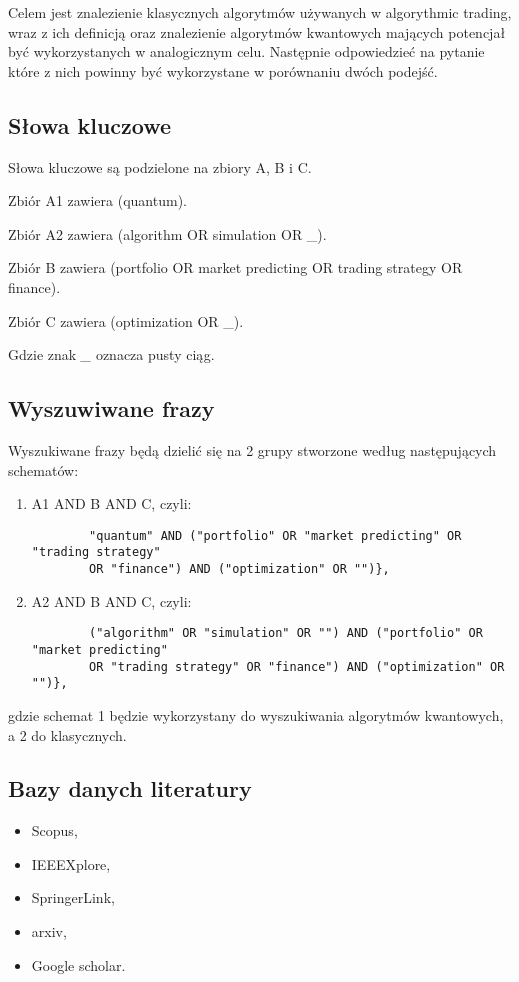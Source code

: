 \documentclass[polish,envcountsect,10pt]{article}
\begin{document}
Celem jest znalezienie klasycznych algorytmów używanych w algorythmic trading, wraz z ich definicją oraz znalezienie algorytmów kwantowych mających potencjał być wykorzystanych w analogicznym celu. 
Następnie odpowiedzieć na pytanie które z nich powinny być wykorzystane w porównaniu dwóch podejść. 

\subsection{Słowa kluczowe}
Słowa kluczowe są podzielone na zbiory A, B i C.

Zbiór A1 zawiera (quantum).

Zbiór A2 zawiera (algorithm OR simulation OR \_).

Zbiór B zawiera (portfolio OR market predicting OR trading strategy OR finance).

Zbiór C zawiera (optimization OR \_).

Gdzie znak \emph{\_} oznacza pusty ciąg.

\subsection{Wyszuwiwane frazy}
Wyszukiwane frazy będą dzielić się na 2 grupy stworzone według następujących schematów:
\begin{enumerate}
	\item A1 AND B AND C, czyli: 
	\begin{verbatim} 
		"quantum" AND ("portfolio" OR "market predicting" OR "trading strategy"
		OR "finance") AND ("optimization" OR "")},
	\end{verbatim}
	\item A2 AND B AND C, czyli:
	\begin{verbatim}
		("algorithm" OR "simulation" OR "") AND ("portfolio" OR "market predicting"
		OR "trading strategy" OR "finance") AND ("optimization" OR "")},
	\end{verbatim}
\end{enumerate} 
gdzie schemat 1 będzie wykorzystany do wyszukiwania algorytmów kwantowych, a 2 do klasycznych. 

\subsection{Bazy danych literatury}

\begin{itemize}
	\item Scopus,
	\item IEEEXplore,
	\item SpringerLink,
	\item arxiv,
	\item Google scholar.
\end{itemize}
\end{document}
